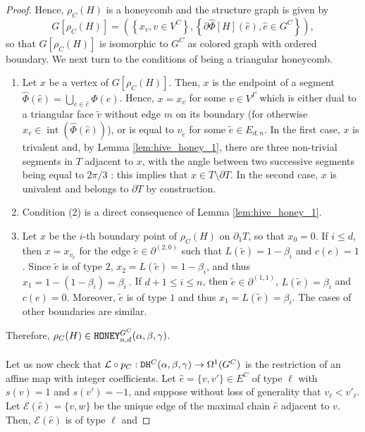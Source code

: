 \documentclass[11pt,a4paper]{amsart}
\providecommand{\honey}{\texttt{\textsc{HONEY}}}
\providecommand{\dualhive}{\texttt{\textsc{DH}}}
\DeclareMathOperator{\interior}{int}
\numberwithin{equation}{section}
\theoremstyle{definition}
\begin{document}
\begin{proof}
\noindent
Hence, $\rho_C(H)$ is a honeycomb and the structure graph is given by 
$$G[\rho_C(H)] = \left( \left\{x_v,v\in V^C \right\}, 
\left\{ \partial\hat{\Phi}[H](\hat{e}),\hat{e}\in G^C \right\}\right),$$
so that $G[\rho_C(H)]$ is isomorphic to $G^C$ as colored graph with ordered boundary.  
We next turn to the conditions of being a triangular honeycomb.
\begin{enumerate}
\item Let $x$ be a vertex of $G[\rho_{C}(H)]$. 
Then, $x$ is the endpoint of a segment $\hat{\Phi}(\hat{e})=\bigcup_{e\in\hat{e}}\Phi(e)$. 
Hence, $x=x_{v}$ for some $v\in V^{\Gamma}$ which is either dual to a triangular face 
$\tilde{v}$ without edge $m$ on its boundary (for otherwise $x_{v}\in \interior(\hat{\Phi}(\hat{e}))$), 
or is equal to $v_{\tilde{e}}$ for some $\tilde{e}\in E_{d,n}$.  
In the first case, $x$ is trivalent and, by Lemma \ref{lem:hive_honey_1}, 
there are three non-trivial segments in $T$ adjacent to $x$, 
with the angle between two successive segments being equal to $2\pi/3$ : 
this implies that $x\in T\setminus \partial T$. 
In the second case, $x$ is univalent and belongs to $\partial T$ by construction.
\item Condition (2) is a direct consequence of Lemma \ref{lem:hive_honey_1}.
\item  Let $x$ be the $i$-th boundary point of $\rho_{C}(H)$ on $\partial_1T$, so that $x_0=0$. 
If $i\leqslant d$, then $x=x_{v_{\tilde{e}}}$ for the edge $\tilde{e}\in \partial^{(2,0)}$ 
such that $L(\tilde{e})=1-\beta_i$ 
and $c(e)=1$. Since $\tilde{e}$ is of type $2$, $x_2=L(\tilde{e})=1-\beta_i$, and thus 
$x_1=1-(1-\beta_i)=\beta_i \ .$
If $d+1\leqslant i\leqslant n$, then $\tilde{e}\in\partial^{(1,1)}$, $L(\tilde{e})=\beta_i$ and $c(e)=0$. 
Moreover, $\tilde{e}$ is of type $1$ and thus $x_1=L(\tilde{e})=\beta_i$. 
The cases of other boundaries are similar.
\end{enumerate}
Therefore, $\rho_{C}(H) \in \honey_{n,d}^{G^C}(\alpha,\beta,\gamma)$.
\\
\\
Let us now check that $ \mathcal{L} \circ p_C: \dualhive^C(\alpha,\beta,\gamma) 
\rightarrow \Omega^1(G^C)$ is the restriction of an affine map with integer coefficients.
Let $\hat{e}=\{v,v'\}\in E^C$ of type $\ell$ with $s(v)=1$ and $s(v')=-1$, 
and suppose without loss of generality that $v_{\ell}<v'_{\ell}$. 
Let $\mathcal{E}(\hat{e})=\{v,w\}$ be the unique edge of the maximal chain 
$\hat{e}$ adjacent to $v$. 
Then, $\mathcal{E}(\hat{e})$ is of type $\ell$ and 

\end{proof}
\end{document}
